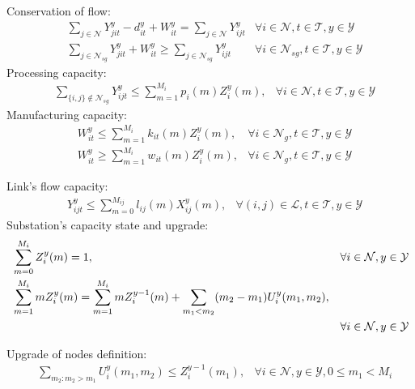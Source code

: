 \documentclass{beamer}
\newcommand{\NN}{\mathcal{N}}
\begin{document}
\begin{frame}
%
%
\small Conservation of flow: \tiny
\begin{align}
& \sum_{j\in\NN}{Y^y_{jit}} - d^y_{it} + W^y_{it} = \sum_{j\in\NN}Y^y_{ijt} & \label{FND:flow} \forall i\in\NN, t\in\mathcal{T}, y\in\mathcal{Y}\\
& \sum_{j\in\NN_{sg}}{Y^y_{jit}} + W^y_{it} \geq \sum_{j\in\NN_{sg}}Y^y_{ijt} & \label{FND:high_volt} \forall i\in\NN_{sg}, t\in\mathcal{T}, y\in\mathcal{Y}
\end{align}
\small Processing capacity: \tiny
\begin{align}
	 & \sum_{\{i,j\}\notin\NN_{sg}}{Y^y_{ijt}} \leq \sum_{m=1}^{M_i}p_i(m)Z^y_i(m), & \label{FND:process_capacity} \forall i\in\NN, t\in\mathcal{T}, y\in\mathcal{Y}
\end{align}
\small Manufacturing capacity: \tiny
\begin{align}
	 & W^y_{it}\leq \sum_{m=1}^{M_i}{k_{it}(m)Z^y_i(m)}, \label{FND:establish_facility} &\forall i\in\NN_g, t\in\mathcal{T}, y\in\mathcal{Y}\\
	 & W^y_{it}\geq \sum_{m=1}^{M_i}{w_{it}(m)Z^y_i(m)}, \label{FND:min_generation} &\forall i\in\NN_g, t\in\mathcal{T}, y\in\mathcal{Y}
\end{align}

\end{frame}

\begin{frame}
	\scriptsize 	Link's flow capacity: \tiny
\begin{align}
	 & Y^y_{ijt}\leq \sum_{m=0}^{M_{ij}}{l_{ij}(m)X^y_{ij}(m)}, \label{FND:link_installed} &\forall (i,j)\in\mathcal{L}, t\in\mathcal{T}, y\in\mathcal{Y}
\end{align}
\scriptsize Substation's capacity state and upgrade: \tiny
\begin{align}
	& \sum_{m=0}^{M_i}{Z_i^y(m)}=1, \label{FND:certain_level} &\forall i\in \NN, y\in\mathcal{Y}\\
	& \sum_{m=1}^{M_i}mZ_i^y(m)=\sum_{m=1}^{M_i}mZ_i^{y-1}(m)+\sum_{m_1<m_2}(m_2-m_1)U_i^y(m_1,m_2), & \notag\\
	&  \label{FND:node_upgrade} & \forall i\in\NN, y\in\mathcal{Y}
\end{align}

\scriptsize Upgrade of nodes definition: \tiny
\begin{align}
  & \sum_{m_2: m_2>m_1}U_i^y(m_1,m_2)\leq Z_i^{y-1}(m_1), \label{FND:upgrade_mat} & \forall i \in\NN, y\in\mathcal{Y}, 0\leq m_1<M_i
\end{align}
	
\end{frame}
\end{document}
